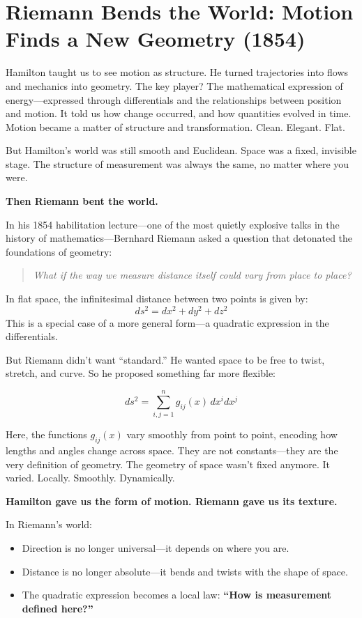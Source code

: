 \section{Riemann Bends the World: Motion Finds a New Geometry (1854)}

Hamilton taught us to see motion as structure. He turned trajectories into flows and mechanics into geometry. The key player? The mathematical expression of energy—expressed through differentials and the relationships between position and motion. It told us how change occurred, and how quantities evolved in time. Motion became a matter of structure and transformation. Clean. Elegant. Flat.

But Hamilton’s world was still smooth and Euclidean. Space was a fixed, invisible stage. The structure of measurement was always the same, no matter where you were. 

\textbf{Then Riemann bent the world.}

In his 1854 habilitation lecture—one of the most quietly explosive talks in the history of mathematics—Bernhard Riemann asked a question that detonated the foundations of geometry:

\begin{quote}
\textit{What if the way we measure distance itself could vary from place to place?}
\end{quote}

In flat space, the infinitesimal distance between two points is given by:
\[
ds^2 = dx^2 + dy^2 + dz^2
\]
This is a special case of a more general form—a quadratic expression in the differentials.

But Riemann didn’t want “standard.” He wanted space to be free to twist, stretch, and curve. So he proposed something far more flexible:

\[
ds^2 = \sum_{i,j=1}^n g_{ij}(x) \, dx^i dx^j
\]

Here, the functions \( g_{ij}(x) \) vary smoothly from point to point, encoding how lengths and angles change across space. They are not constants—they are the very definition of geometry. The geometry of space wasn’t fixed anymore. It varied. Locally. Smoothly. Dynamically.

\textbf{Hamilton gave us the form of motion. Riemann gave us its texture.}

In Riemann’s world:
\begin{itemize}
  \item Direction is no longer universal—it depends on where you are.
  \item Distance is no longer absolute—it bends and twists with the shape of space.
  \item The quadratic expression becomes a local law: \textbf{“How is measurement defined here?”}
\end{itemize}

